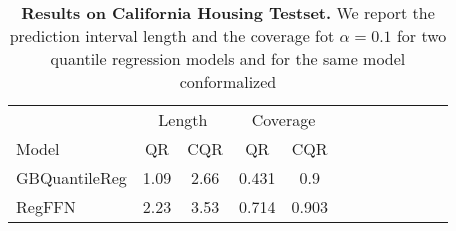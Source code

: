 \begin{table}[t] 
\centering 
\small 
\begin{tabular}{lccccccccccc} 
\toprule 
 & \multicolumn{2}{c}{Length}  & \multicolumn{2}{c}{Coverage}  \\ 
\cmidrule(r){2-3}  \cmidrule(r){4-5} 
Model & QR & CQR & QR & CQR \\ 
\midrule 
 GBQuantileReg & 1.09 & 2.66 & 0.431 & 0.9 \\ 
 RegFFN & 2.23 & 3.53 & 0.714 & 0.903 \\ 
\bottomrule 
\end{tabular} 
\caption{\textbf{Results on California Housing Testset.} We report the prediction interval length and the coverage fot $\alpha=0.1$ for two quantile regression models and for the same model conformalized} 
\label{table:California_test_0.1} 
\end{table} 
